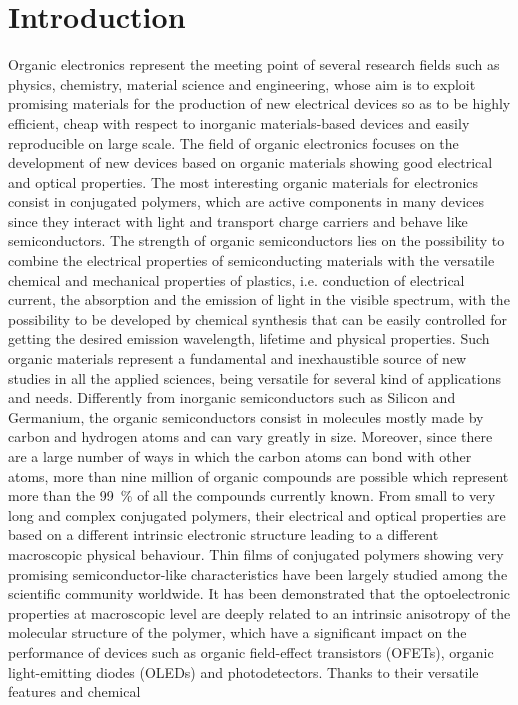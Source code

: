 \documentclass  [
  paper    = a4,
  BCOR     = 10mm,
  twoside,
  fontsize = 12pt,
  fleqn,
  toc      = bibnumbered,
  toc      = listofnumbered,
  numbers  = noendperiod,
  headings = normal,
  listof   = leveldown,
  version  = 3.03
]                                       {scrreprt}
\begin{document}
  
  	

  \tableofcontents%

  \chapter{Introduction}\label{cha:intro}


Organic electronics represent the meeting point of several research fields such as physics, chemistry, material science and engineering, whose aim is to exploit promising materials for the production of new electrical devices so as to be highly efficient, cheap with respect to inorganic materials-based devices and easily reproducible on large scale. The field of organic electronics focuses on the development of new devices based on organic materials showing good electrical and optical properties. The most interesting organic materials for electronics consist in conjugated polymers, which are active components in many devices since they interact with light and transport charge carriers and behave like semiconductors. The strength of organic semiconductors lies on the possibility to combine the electrical properties of semiconducting materials with the versatile chemical and mechanical properties of plastics, i.e. conduction of electrical current, the absorption and the emission of light in the visible spectrum, with the possibility to be developed by chemical synthesis that can be easily controlled for getting the desired emission wavelength, lifetime and physical properties. Such organic materials represent a fundamental and inexhaustible source of new studies in all the applied sciences, being versatile for several kind of applications and needs. Differently from inorganic semiconductors such as Silicon and Germanium, the organic semiconductors consist in molecules mostly made by carbon and hydrogen atoms and can vary greatly in size. Moreover, since there are a large number of ways in which the carbon atoms can bond with other atoms, more than nine million of organic compounds are possible which represent more than the \SI{99}{\percent} of all the compounds currently known\cite{art:compounds}. From small to very long and complex conjugated polymers, their electrical and optical properties are based on a different intrinsic electronic structure leading to a different macroscopic physical behaviour. Thin films of conjugated polymers showing very promising semiconductor-like characteristics have been largely studied among the scientific community worldwide. It has been demonstrated that the optoelectronic properties at macroscopic level are deeply related to an intrinsic anisotropy of the molecular structure of the polymer, which have a significant impact on the performance of devices such as organic field-effect transistors (OFETs), organic light-emitting diodes (OLEDs) and photodetectors. Thanks to their versatile features and chemical 
\end{document}
